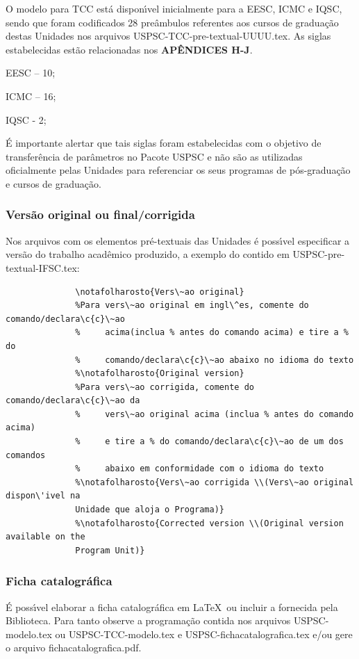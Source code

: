 O modelo para TCC est\'a dispon\'{\i}vel inicialmente para a EESC, ICMC e IQSC, sendo que foram codificados 28 pre\^ambulos referentes aos cursos de gradua\c{c}\~ao destas Unidades nos arquivos USPSC-TCC-pre-textual-UUUU.tex. As siglas estabelecidas est\~ao relacionadas nos \textbf{AP\^ENDICES H-J}.
				\begin{alineas}
					\item EESC – 10;
					\item  ICMC – 16;
					\item  IQSC - 2;
				\end{alineas}	
	  						
\'E importante alertar que tais siglas foram estabelecidas com o objetivo de transfer\^encia de par\^ametros no Pacote USPSC e n\~ao s\~ao as utilizadas oficialmente pelas Unidades para referenciar os seus programas de p\'os-gradua\c{c}\~ao e cursos de gradua\c{c}\~ao.

\subsubsection{Vers\~ao original ou final/corrigida}
Nos arquivos com os elementos pr\'e-textuais das Unidades \'e poss\'{\i}vel especificar a vers\~ao do trabalho acad\^emico produzido, a exemplo do contido em USPSC-pre-textual-IFSC.tex:	  
			  \begin{verbatim}
			  \notafolharosto{Vers\~ao original}
			  %Para vers\~ao original em ingl\^es, comente do comando/declara\c{c}\~ao 
			  %     acima(inclua % antes do comando acima) e tire a % do 
			  %     comando/declara\c{c}\~ao abaixo no idioma do texto
			  %\notafolharosto{Original version} 
			  %Para vers\~ao corrigida, comente do comando/declara\c{c}\~ao da 
			  %     vers\~ao original acima (inclua % antes do comando acima) 
			  %     e tire a % do comando/declara\c{c}\~ao de um dos comandos 
			  %     abaixo em conformidade com o idioma do texto
			  %\notafolharosto{Vers\~ao corrigida \\(Vers\~ao original dispon\'ivel na
			  Unidade que aloja o Programa)}
			  %\notafolharosto{Corrected version \\(Original version available on the
			  Program Unit)}
			  \end{verbatim}
			  
\subsubsection{Ficha catalogr\'afica}
\'E poss\'{\i}vel elaborar a ficha catalogr\'afica em \LaTeX\ ou incluir a fornecida pela Biblioteca. Para tanto observe a programa\c{c}\~ao contida nos arquivos USPSC-modelo.tex ou USPSC-TCC-modelo.tex  e USPSC-fichacatalografica.tex e/ou gere o arquivo fichacatalografica.pdf.
	  
